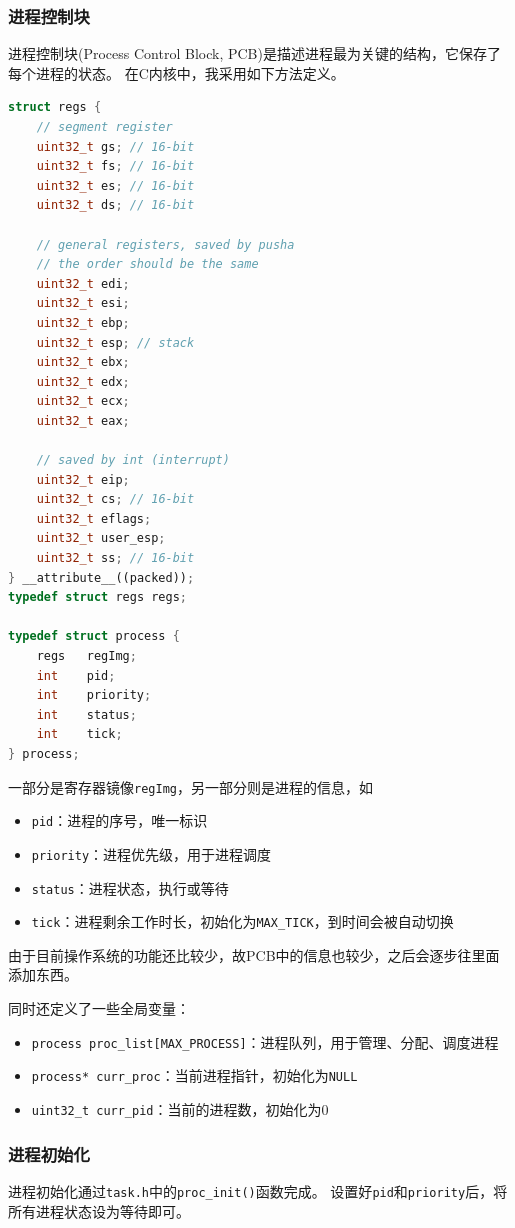 \documentclass[logo,reportComp]{thesis}
\begin{document}
\subsubsection{进程控制块}
进程控制块(Process Control Block, PCB)是描述进程最为关键的结构，它保存了每个进程的状态。
在C内核中，我采用如下方法定义。
\begin{lstlisting}[language=c++]
struct regs {
	// segment register
	uint32_t gs; // 16-bit
	uint32_t fs; // 16-bit
	uint32_t es; // 16-bit
	uint32_t ds; // 16-bit

	// general registers, saved by pusha
	// the order should be the same
	uint32_t edi;
	uint32_t esi;
	uint32_t ebp;
	uint32_t esp; // stack
	uint32_t ebx;
	uint32_t edx;
	uint32_t ecx;
	uint32_t eax;

	// saved by int (interrupt)
	uint32_t eip;
	uint32_t cs; // 16-bit
	uint32_t eflags;
	uint32_t user_esp;
	uint32_t ss; // 16-bit
} __attribute__((packed));
typedef struct regs regs;

typedef struct process {
	regs   regImg;
	int    pid;
	int    priority;
	int    status;
	int    tick;
} process;
\end{lstlisting}

一部分是寄存器镜像\verb'regImg'，另一部分则是进程的信息，如
\begin{itemize}
	\item \verb'pid'：进程的序号，唯一标识
	\item \verb'priority'：进程优先级，用于进程调度
	\item \verb'status'：进程状态，执行或等待
	\item \verb'tick'：进程剩余工作时长，初始化为\verb'MAX_TICK'，到时间会被自动切换
\end{itemize}

由于目前操作系统的功能还比较少，故PCB中的信息也较少，之后会逐步往里面添加东西。

同时还定义了一些全局变量：
\begin{itemize}
	\item \verb'process proc_list[MAX_PROCESS]'：进程队列，用于管理、分配、调度进程
	\item \verb'process* curr_proc'：当前进程指针，初始化为\verb'NULL'
	\item \verb'uint32_t curr_pid'：当前的进程数，初始化为0
\end{itemize}

\subsubsection{进程初始化}
进程初始化通过\verb'task.h'中的\verb'proc_init()'函数完成。
设置好\verb'pid'和\verb'priority'后，将所有进程状态设为等待即可。
\end{document}
